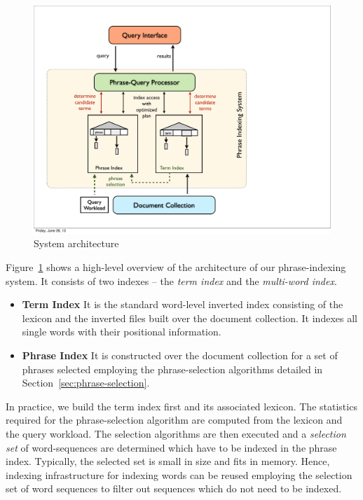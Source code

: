 \begin{figure}[ht]
  \centering
    \includegraphics[width=0.85\columnwidth]{resources/epiq-sysarch.pdf}
  \caption{System architecture} 
    \label{fig:epiq_sysarch}
\end{figure}

Figure~\ref{fig:epiq_sysarch} shows a high-level overview of the architecture of our phrase-indexing system. It consists of two indexes -- the \emph{term index} and the \emph{multi-word index}. 

\begin{itemize}

\item \textbf{Term Index} It is the standard word-level inverted index consisting of the lexicon and the inverted files built over the document collection. It indexes all single words with their positional information.

\item \textbf{Phrase Index} It is constructed over the document collection for a set of phrases selected employing the phrase-selection algorithms detailed in Section~\ref{sec:phrase-selection}.

\end{itemize}

In practice, we build the term index first and its associated lexicon. The statistics required for the phrase-selection algorithm are computed from the lexicon and the query workload. The selection algorithms are then executed and a \emph{selection set} of word-sequences are determined which have to be indexed in the phrase index.
Typically, the selected set is small in size and fits in memory. Hence, indexing infrastructure for indexing words can be reused employing the selection set of word sequences to filter out sequences which do not need to be indexed. 

